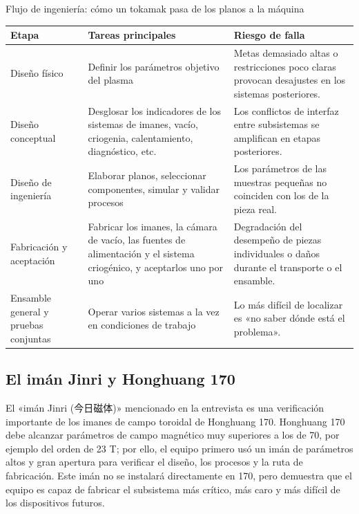 \documentclass[a4paper]{article}
\begin{document}
\begin{knowledgebox}{Flujo de ingeniería: cómo un tokamak pasa de los planos a la máquina}
\begin{tabularx}{\textwidth}{p{}p{}X}
\toprule
Etapa & Tareas principales & Riesgo de falla \\
\midrule
Diseño físico & Definir los parámetros objetivo del plasma & Metas demasiado altas o restricciones poco claras provocan desajustes en los sistemas posteriores. \\
Diseño conceptual & Desglosar los indicadores de los sistemas de imanes, vacío, criogenia, calentamiento, diagnóstico, etc. & Los conflictos de interfaz entre subsistemas se amplifican en etapas posteriores. \\
Diseño de ingeniería & Elaborar planos, seleccionar componentes, simular y validar procesos & Los parámetros de las muestras pequeñas no coinciden con los de la pieza real. \\
Fabricación y aceptación & Fabricar los imanes, la cámara de vacío, las fuentes de alimentación y el sistema criogénico, y aceptarlos uno por uno & Degradación del desempeño de piezas individuales o daños durante el transporte o el ensamble. \\
Ensamble general y pruebas conjuntas & Operar varios sistemas a la vez en condiciones de trabajo & Lo más difícil de localizar es «no saber dónde está el problema». \\
\bottomrule
\end{tabularx}
\end{knowledgebox}

\subsection{El imán Jinri y Honghuang 170}

El «imán Jinri (今日磁体)» mencionado en la entrevista es una verificación importante de los imanes de campo toroidal de Honghuang 170. Honghuang 170 debe alcanzar parámetros de campo magnético muy superiores a los de 70, por ejemplo del orden de 23 T; por ello, el equipo primero usó un imán de parámetros altos y gran apertura para verificar el diseño, los procesos y la ruta de fabricación. Este imán no se instalará directamente en 170, pero demuestra que el equipo es capaz de fabricar el subsistema más crítico, más caro y más difícil de los dispositivos futuros.
\end{document}

